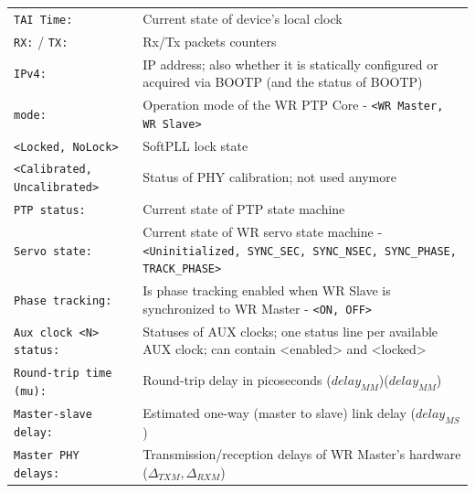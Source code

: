 \documentclass[a4paper, 12pt]{article}
\newcommand{\code}[1]{\texttt{#1}}
\begin{document}
\footnotesize
\renewcommand\arraystretch{1.5}
\begin{longtable}{  p{4.5cm}  p{10cm} }

  \code{TAI Time:} & Current state of device's local clock \\

  \code{RX:} / \code{TX:} & Rx/Tx packets counters\\

  \code{IPv4:} & IP address; also whether it is statically configured or
    acquired via BOOTP (and the status of BOOTP) \\

  \code{mode:} & Operation mode of the WR PTP Core - \code{<WR Master,
    WR Slave>}\\

  \code{<Locked, NoLock>} & SoftPLL lock state\\

  \code{<Calibrated, Uncalibrated>} & Status of PHY calibration; not used
    anymore\\

  \code{PTP status:} & Current state of PTP state machine\\

  \code{Servo state:} & Current state of WR servo state machine -
    \code{<Uninitialized, SYNC\_SEC, SYNC\_NSEC, SYNC\_PHASE, TRACK\_PHASE>}\\

  \code{Phase tracking:} & Is phase tracking enabled when WR Slave is
    synchronized to WR Master - \code{<ON, OFF>}\\

  \code{Aux clock <N> status:} & Statuses of AUX clocks; one status line per
    available AUX clock; can contain <enabled> and <locked> \\


  \code{Round-trip time (mu):} & Round-trip delay in picoseconds
    ($delay_{MM}$)($delay_{MM}$)\\

  \code{Master-slave delay:} & Estimated one-way (master to slave) link
    delay ($delay_{MS}$)\\

  \code{Master PHY delays:} & Transmission/reception delays of WR 
    Master's hardware ($\Delta_{TXM}, \Delta_{RXM}$)\\


\end{longtable}
\end{document}
